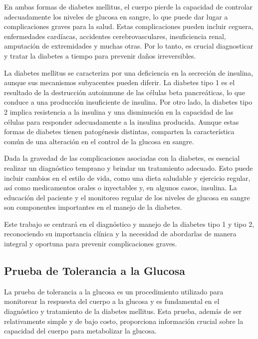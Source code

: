 En ambas formas de diabetes mellitus, el cuerpo pierde la capacidad de controlar adecuadamente los niveles de glucosa en sangre, lo que puede dar lugar a complicaciones graves para la salud. Estas complicaciones pueden incluir ceguera, enfermedades cardíacas, accidentes cerebrovasculares, insuficiencia renal, amputación de extremidades y muchas otras. Por lo tanto, es crucial diagnosticar y tratar la diabetes a tiempo para prevenir daños irreversibles.

La diabetes mellitus se caracteriza por una deficiencia en la secreción de insulina, aunque sus mecanismos subyacentes pueden diferir. La diabetes tipo 1 es el resultado de la destrucción autoinmune de las células beta pancreáticas, lo que conduce a una producción insuficiente de insulina. Por otro lado, la diabetes tipo 2 implica resistencia a la insulina y una disminución en la capacidad de las células para responder adecuadamente a la insulina producida. Aunque estas formas de diabetes tienen patogénesis distintas, comparten la característica común de una alteración en el control de la glucosa en sangre.

Dada la gravedad de las complicaciones asociadas con la diabetes, es esencial realizar un diagnóstico temprano y brindar un tratamiento adecuado. Esto puede incluir cambios en el estilo de vida, como una dieta saludable y ejercicio regular, así como medicamentos orales o inyectables y, en algunos casos, insulina. La educación del paciente y el monitoreo regular de los niveles de glucosa en sangre son componentes importantes en el manejo de la diabetes.

Este trabajo se centrará en el diagnóstico y manejo de la diabetes tipo 1 y tipo 2, reconociendo su importancia clínica y la necesidad de abordarlas de manera integral y oportuna para prevenir complicaciones graves.

\subsection{Prueba de Tolerancia a la Glucosa}

La prueba de tolerancia a la glucosa es un procedimiento utilizado para monitorear la respuesta del cuerpo a la glucosa y es fundamental en el diagnóstico y tratamiento de la diabetes mellitus. Esta prueba, además de ser relativamente simple y de bajo costo, proporciona información crucial sobre la capacidad del cuerpo para metabolizar la glucosa.

